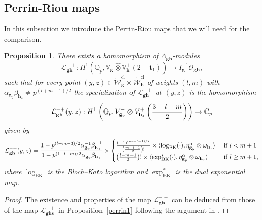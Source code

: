 \documentclass[a4paper,11pt]{amsart}
\theoremstyle{plain}
\newtheorem{propo}[theorem]{Proposition}
\theoremstyle{definition}
\newtheorem{defi}[theorem]{Definition}
\theoremstyle{remark}
\newcommand{\cl}{\mathcal}
\DeclareMathOperator{\BK}{BK}
\newcommand{\hg}{{\mathbf{g}}}
\newcommand{\hh}{{\mathbf h}}
\numberwithin{equation}{section}
\begin{document}

\subsection{Perrin-Riou maps}

In this subsection we introduce the Perrin-Riou maps that we will need for the comparison.

\begin{propo}\label{prop:2variablePR}
There exists a
homomorphism of $\Lambda_{\hg \hh}$-modules
\[
\mathcal L_{\hg \hh}^{-+}: H^1(\mathbb Q_p, \mathbb V_{\hg}^- \hat \otimes \mathbb V_{\hh}^+ (2-\mathbf{t}_1)) \rightarrow  I_{\hg}^{-1}\cl{O}_{\hg \hh},
\]
such that for every point $(y,z) \in \tilde{\cl{W}}_{\hg}^{\mathrm{cl}}\times \tilde{\cl{W}}_{\hh}^{\mathrm{cl}}$ of weights $(l,m)$ with $\alpha_{\hg_y}\beta_{\hh_z}\neq p^{(l+m-1)/2}$ the specialization of $\mathcal L_{\hg \hh}^{-+}$ at $(y,z)$ is the homomorphism
\[
\mathcal L_{{\bf gh}}^{-+}(y,z): H^1\left(\mathbb Q_p, V_{\hg_y}^- \otimes V_{\hh_z}^+\left(\frac{3-l-m}{2}\right)\right) \rightarrow \mathbb C_p
\]
given by
\[
\mathcal L_{{\bf gh}}^{-+}(y,z) = \frac{1-p^{(l+m-3)/2} \alpha_{\hg_y}^{-1} \beta_{\hh_z}^{-1}}{1-p^{(1-l-m)/2} \alpha_{\hg_y} \beta_{\hh_z}} \times \begin{cases} \frac{(-1)^{(m-l-1)/2}}{\left(\frac{m-l-1}{2}\right)!} \times \langle \log_{\BK}(\cdot), \eta_{\hg_y}^\alpha \otimes \omega_{\hh_z} \rangle & \text{ if } l < m+1 \\ \left(\frac{l-m-1}{2}\right)! \times \langle \exp_{\BK}^*(\cdot), \eta_{\hg_y}^\alpha \otimes \omega_{\hh_z} \rangle & \text{ if } l \geq m+1, \end{cases}
\]
where $\log_{\BK}$ is the Bloch--Kato logarithm and $\exp_{\BK}^*$ is the dual exponential map.
\end{propo}
\begin{proof}
    The existence and properties of the map $\cl{L}_{\hg\hh}^{-+}$ can be deduced from those of the map $\cl{L}_{\hg\hh\mathbf{s}}^{-+}$ in Proposition~\ref{perrin1} following the argument in \cite[Prop.~7.3]{BSV}.
\end{proof}
\end{document}
